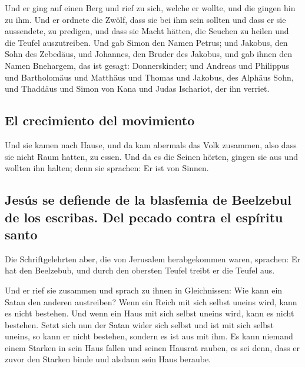  Und er ging auf einen Berg und rief zu sich, welche er
wollte, und die gingen hin zu ihm.  Und er ordnete die
Zwölf, dass sie bei ihm sein sollten und dass er sie aussendete, zu
predigen,  und dass sie Macht hätten, die Seuchen zu
heilen und die Teufel auszutreiben.  Und gab Simon den
Namen Petrus;  und Jakobus, den Sohn des Zebedäus, und
Johannes, den Bruder des Jakobus, und gab ihnen den Namen Bnehargem, das
ist gesagt: Donnerskinder;  und Andreas und Philippus und
Bartholomäus und Matthäus und Thomas und Jakobus, des Alphäus Sohn, und
Thaddäus und Simon von Kana  und Judas Ischariot, der ihn
verriet.

\hypertarget{el-crecimiento-del-movimiento}{%
\subsection{El crecimiento del
movimiento}\label{el-crecimiento-del-movimiento}}

 Und sie kamen nach Hause, und da kam abermals das Volk
zusammen, also dass sie nicht Raum hatten, zu essen.  Und
da es die Seinen hörten, gingen sie aus und wollten ihn halten; denn sie
sprachen: Er ist von Sinnen.

\hypertarget{jesuxfas-se-defiende-de-la-blasfemia-de-beelzebul-de-los-escribas.-del-pecado-contra-el-espuxedritu-santo}{%
\subsection{Jesús se defiende de la blasfemia de Beelzebul de los
escribas. Del pecado contra el espíritu
santo}\label{jesuxfas-se-defiende-de-la-blasfemia-de-beelzebul-de-los-escribas.-del-pecado-contra-el-espuxedritu-santo}}

 Die Schriftgelehrten aber, die von Jerusalem
herabgekommen waren, sprachen: Er hat den Beelzebub, und durch den
obersten Teufel treibt er die Teufel aus.

 Und er rief sie zusammen und sprach zu ihnen in
Gleichnissen: Wie kann ein Satan den anderen austreiben? 
Wenn ein Reich mit sich selbst uneins wird, kann es nicht bestehen.
 Und wenn ein Haus mit sich selbst uneins wird, kann es
nicht bestehen.  Setzt sich nun der Satan wider sich
selbst und ist mit sich selbst uneins, so kann er nicht bestehen,
sondern es ist aus mit ihm.  Es kann niemand einem
Starken in sein Haus fallen und seinen Hausrat rauben, es sei denn, dass
er zuvor den Starken binde und alsdann sein Haus beraube.

